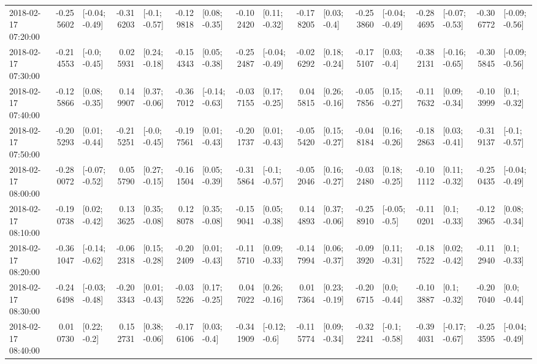 \begin{tabular}{lrlrlrlrlrlrlrlrl}
2018-02-17 07:20:00 & -0.255602 &  [-0.04; -0.49] & -0.316203 &   [-0.1; -0.57] & -0.129818 &   [0.08; -0.35] & -0.102420 &   [0.11; -0.32] & -0.178205 &    [0.03; -0.4] & -0.253860 &  [-0.04; -0.49] & -0.284695 &  [-0.07; -0.53] & -0.306772 &  [-0.09; -0.56] \\
2018-02-17 07:30:00 & -0.214553 &   [-0.0; -0.45] &  0.025931 &   [0.24; -0.18] & -0.154343 &   [0.05; -0.38] & -0.252487 &  [-0.04; -0.49] & -0.026292 &   [0.18; -0.24] & -0.175107 &    [0.03; -0.4] & -0.382131 &  [-0.16; -0.65] & -0.305845 &  [-0.09; -0.56] \\
2018-02-17 07:40:00 & -0.125866 &   [0.08; -0.35] &  0.149907 &   [0.37; -0.06] & -0.367012 &  [-0.14; -0.63] & -0.037155 &   [0.17; -0.25] &  0.045815 &   [0.26; -0.16] & -0.057856 &   [0.15; -0.27] & -0.117632 &   [0.09; -0.34] & -0.103999 &    [0.1; -0.32] \\
2018-02-17 07:50:00 & -0.205293 &   [0.01; -0.44] & -0.215251 &   [-0.0; -0.45] & -0.197561 &   [0.01; -0.43] & -0.201737 &   [0.01; -0.43] & -0.055420 &   [0.15; -0.27] & -0.048184 &   [0.16; -0.26] & -0.182863 &   [0.03; -0.41] & -0.319137 &   [-0.1; -0.57] \\
2018-02-17 08:00:00 & -0.280072 &  [-0.07; -0.52] &  0.055790 &   [0.27; -0.15] & -0.161504 &   [0.05; -0.39] & -0.315864 &   [-0.1; -0.57] & -0.052046 &   [0.16; -0.27] & -0.032480 &   [0.18; -0.25] & -0.101112 &   [0.11; -0.32] & -0.250435 &  [-0.04; -0.49] \\
2018-02-17 08:10:00 & -0.190738 &   [0.02; -0.42] &  0.133625 &   [0.35; -0.08] &  0.128078 &   [0.35; -0.08] & -0.159041 &   [0.05; -0.38] &  0.144893 &   [0.37; -0.06] & -0.258910 &   [-0.05; -0.5] & -0.110201 &    [0.1; -0.33] & -0.123965 &   [0.08; -0.34] \\
2018-02-17 08:20:00 & -0.361047 &  [-0.14; -0.62] & -0.062318 &   [0.15; -0.28] & -0.202409 &   [0.01; -0.43] & -0.115710 &   [0.09; -0.33] & -0.147994 &   [0.06; -0.37] & -0.093920 &   [0.11; -0.31] & -0.187522 &   [0.02; -0.42] & -0.112940 &    [0.1; -0.33] \\
2018-02-17 08:30:00 & -0.246498 &  [-0.03; -0.48] & -0.203343 &   [0.01; -0.43] & -0.035226 &   [0.17; -0.25] &  0.047022 &   [0.26; -0.16] &  0.017364 &   [0.23; -0.19] & -0.206715 &    [0.0; -0.44] & -0.103887 &    [0.1; -0.32] & -0.207040 &    [0.0; -0.44] \\
2018-02-17 08:40:00 &  0.010730 &    [0.22; -0.2] &  0.152731 &   [0.38; -0.06] & -0.176106 &    [0.03; -0.4] & -0.341909 &   [-0.12; -0.6] & -0.115774 &   [0.09; -0.34] & -0.322241 &   [-0.1; -0.58] & -0.394031 &  [-0.17; -0.67] & -0.253595 &  [-0.04; -0.49] \\

\end{tabular}
